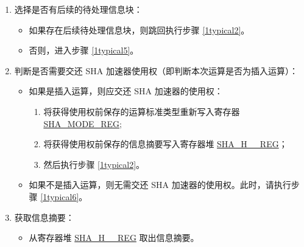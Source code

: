 \documentclass[main\_\_CN.tex]{subfiles}
\begin{document}
\begin{enumerate}
    \item \label{1typical4}
    选择是否有后续的待处理信息块：
        \begin{itemize}
            \item 如果存在后续待处理信息块，则跳回执行步骤 \ref{1typical2}。
            \item 否则，进入步骤 \ref{1typical5}。
        \end{itemize}

    \item \label{1typical5} 判断是否需要交还 SHA 加速器使用权（即判断本次运算是否为插入运算）：
        \begin{itemize}
            \item 如果是插入运算，则应交还 SHA 加速器的使用权：
            \begin{enumerate}
                \item 将获得使用权前保存的运算标准类型重新写入寄存器 \hyperref[regdesc:SHAMODEREG]{SHA\_MODE\_REG};
                \item 将获得使用权前保存的信息摘要写入寄存器堆 \hyperref[regdesc:SHAHNREG]{SHA\_H\_\_REG}；
                \item 然后执行步骤 \ref{1typical2}。
            \end{enumerate}
            \item 如果不是插入运算，则无需交还 SHA 加速器的使用权。此时，请执行步骤 \ref{1typical6}。
        \end{itemize}

    \item \label{1typical6}获取信息摘要：
    \begin{itemize}
        \item 从寄存器堆 \hyperref[regdesc:SHAHNREG]{SHA\_H\_\_REG} 取出信息摘要。
    \end{itemize}
\end{enumerate}
\end{document}
